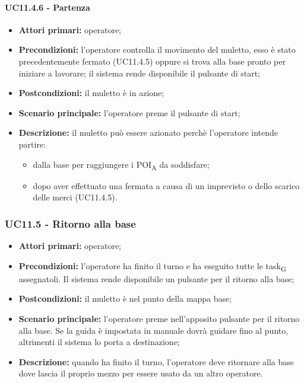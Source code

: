 \paragraph{UC11.4.6 - Partenza}
\begin{itemize}
	\item 	\textbf{Attori primari:} operatore;
	\item 	\textbf{Precondizioni:} l'operatore controlla il movimento del muletto, esso è stato precedentemente fermato (UC11.4.5) oppure si trova alla base pronto per iniziare a lavorare; il sistema rende disponibile il pulsante di start;
	\item 	\textbf{Postcondizioni:} il muletto è in azione;
	\item 	\textbf{Scenario principale:} l'operatore preme il pulsante di start;
	\item 	\textbf{Descrizione:} il muletto può essere azionato perchè l'operatore intende partire:
	\begin{itemize}
		\item dalla base per raggiungere i POI\textsubscript{A} da soddisfare;
		\item dopo aver effettuato una fermata a causa di un imprevisto o dello scarico delle merci (UC11.4.5).
	\end{itemize}
\end{itemize}


\subsubsection{UC11.5 - Ritorno alla base}
\begin{itemize}
	\item 	\textbf{Attori primari:} operatore;
	\item 	\textbf{Precondizioni:} l'operatore ha finito il turno e ha eseguito tutte le task\textsubscript{G} assegnatoli. Il sistema rende disponibile un pulsante per il ritorno alla base;
	\item 	\textbf{Postcondizioni:} il muletto è nel punto della mappa base;
	\item 	\textbf{Scenario principale:} l'operatore preme nell'apposito pulsante per il ritorno alla base. Se la guida è impostata in manuale dovrà guidare fino al punto, altrimenti il sistema lo porta a destinazione;
	\item 	\textbf{Descrizione:} quando ha finito il turno, l'operatore deve ritornare alla base dove lascia il proprio mezzo per essere usato da un altro operatore.
\end{itemize}

